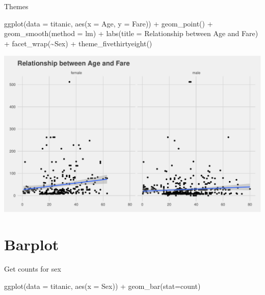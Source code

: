 \documentclass[
]{book}
\newenvironment{Shaded}{\begin{snugshade}}{\end{snugshade}}
\newcommand{\AttributeTok}[1]{\textcolor[rgb]{0.77,0.63,0.00}{#1}}
\newcommand{\FunctionTok}[1]{\textcolor[rgb]{0.00,0.00,0.00}{#1}}
\newcommand{\NormalTok}[1]{#1}
\newcommand{\SpecialCharTok}[1]{\textcolor[rgb]{0.00,0.00,0.00}{#1}}
\newcommand{\StringTok}[1]{\textcolor[rgb]{0.31,0.60,0.02}{#1}}
\begin{document}
Themes

\begin{Shaded}
\begin{Highlighting}[]
\FunctionTok{ggplot}\NormalTok{(}\AttributeTok{data =}\NormalTok{ titanic, }\FunctionTok{aes}\NormalTok{(}\AttributeTok{x =}\NormalTok{ Age, }\AttributeTok{y =}\NormalTok{ Fare)) }\SpecialCharTok{+} \FunctionTok{geom\_point}\NormalTok{() }\SpecialCharTok{+} \FunctionTok{geom\_smooth}\NormalTok{(}\AttributeTok{method =} \StringTok{\textquotesingle{}lm\textquotesingle{}}\NormalTok{) }\SpecialCharTok{+} \FunctionTok{labs}\NormalTok{(}\AttributeTok{title =} \StringTok{\textquotesingle{}Relationship between Age and Fare\textquotesingle{}}\NormalTok{) }\SpecialCharTok{+}
  \FunctionTok{facet\_wrap}\NormalTok{(}\SpecialCharTok{\textasciitilde{}}\NormalTok{Sex) }\SpecialCharTok{+} \FunctionTok{theme\_fivethirtyeight}\NormalTok{()}
\end{Highlighting}
\end{Shaded}

\includegraphics{figures/unnamed-chunk-140-1.pdf}

\hypertarget{barplot}{%
\section*{Barplot}\label{barplot}}

Get counts for sex

\begin{Shaded}
\begin{Highlighting}[]
\FunctionTok{ggplot}\NormalTok{(}\AttributeTok{data =}\NormalTok{ titanic, }\FunctionTok{aes}\NormalTok{(}\AttributeTok{x =}\NormalTok{ Sex)) }\SpecialCharTok{+} \FunctionTok{geom\_bar}\NormalTok{(}\AttributeTok{stat=}\StringTok{\textquotesingle{}count\textquotesingle{}}\NormalTok{)}
\end{Highlighting}
\end{Shaded}
\end{document}
